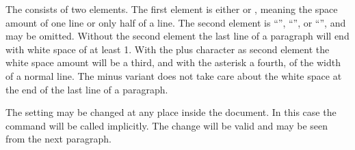\begin{Declaration}
\end{Declaration}
The  consists of two elements. The first element is either
 or , meaning the space amount of one line or only
half of a line. The second element is ``\PValue{*}'', ``\PValue{+}'', or
``\PValue{-}'', and may be omitted. Without the second element the last line
of a paragraph will end with white space of at least 1. With the plus
character as second element the white space amount will be a third, and with
the asterisk a fourth, of the width of a normal line. The minus variant does
not take care about the white space at the end of the last line of a
paragraph.

The setting may be changed at any place inside the document. In this case the
command %
will be called implicitly. The change will be valid and may be seen from the
next paragraph.

